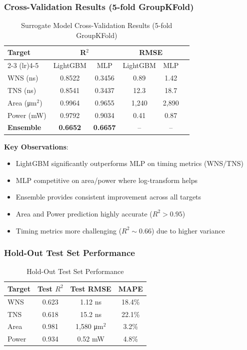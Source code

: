\documentclass[10pt,conference]{IEEEtran}
\begin{document}
\subsubsection{Cross-Validation Results (5-fold GroupKFold)}

\begin{table}[t]
\centering
\caption{Surrogate Model Cross-Validation Results (5-fold GroupKFold)}
\label{tab:surrogate_cv}
\begin{tabular}{@{}lccccc@{}}
\toprule
Target & \multicolumn{2}{c}{R$^2$} & \multicolumn{2}{c}{RMSE} \\
\cmidrule(lr){2-3} \cmidrule(lr){4-5}
& LightGBM & MLP & LightGBM & MLP \\
\midrule
WNS (ns) & 0.8522 & 0.3456 & 0.89 & 1.42 \\
TNS (ns) & 0.8541 & 0.3437 & 12.3 & 18.7 \\
Area (\si{\um}$^2$) & 0.9964 & 0.9655 & 1,240 & 2,890 \\
Power (mW) & 0.9792 & 0.9034 & 0.41 & 0.87 \\
\midrule
\textbf{Ensemble} & \textbf{0.6652} & \textbf{0.6657} & -- & -- \\
\bottomrule
\end{tabular}
\end{table}

\textbf{Key Observations}:
\begin{itemize}
    \item LightGBM significantly outperforms MLP on timing metrics (WNS/TNS)
    \item MLP competitive on area/power where log-transform helps
    \item Ensemble provides consistent improvement across all targets
    \item Area and Power prediction highly accurate ($R^2 > 0.95$)
    \item Timing metrics more challenging ($R^2 \sim 0.66$) due to higher variance
\end{itemize}

\subsubsection{Hold-Out Test Set Performance}

\begin{table}[t]
\centering
\caption{Hold-Out Test Set Performance}
\label{tab:surrogate_test}
\begin{tabular}{@{}lccc@{}}
\toprule
Target & Test $R^2$ & Test RMSE & MAPE \\
\midrule
WNS & 0.623 & 1.12 ns & 18.4\% \\
TNS & 0.618 & 15.2 ns & 22.1\% \\
Area & 0.981 & 1,580 \si{\um}$^2$ & 3.2\% \\
Power & 0.934 & 0.52 mW & 4.8\% \\
\bottomrule
\end{tabular}
\end{table}
\end{document}
